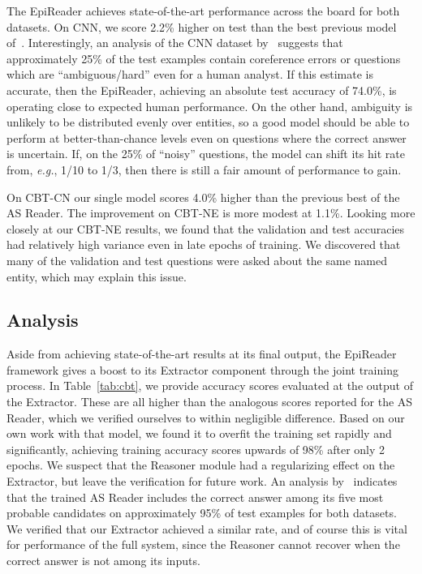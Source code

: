 \documentclass[11pt,letterpaper]{article}
\begin{document}
The EpiReader achieves state-of-the-art performance across the board for both datasets. On CNN, we score 2.2\% higher on test than the best previous model of~. Interestingly, an analysis of the CNN dataset by~ suggests that approximately 25\% of the test examples contain coreference errors or questions which are ``ambiguous/hard'' even for a human analyst. If this estimate is accurate, then the EpiReader, achieving an absolute test accuracy of 74.0\%, is operating close to expected human performance. On the other hand, ambiguity is unlikely to be distributed evenly over entities, so a good model should be able to perform at better-than-chance levels even on questions where the correct answer is uncertain. If, on the 25\% of ``noisy'' questions, the model can shift its hit rate from, {\it e.g.}, 1/10 to 1/3, then there is still a fair amount of performance to gain.

On CBT-CN our single model scores 4.0\% higher than the previous best of the AS Reader. The improvement on CBT-NE is more modest at 1.1\%. Looking more closely at our CBT-NE results, we found that the validation and test accuracies had relatively high variance even in late epochs of training. We discovered that many of the validation and test questions were asked about the same named entity, which may explain this issue.

\subsection{Analysis}
Aside from achieving state-of-the-art results at its final output, the EpiReader framework gives a boost to its Extractor component through the joint training process. In Table~\ref{tab:cbt}, we provide accuracy scores evaluated at the output of the Extractor. These are all higher than the analogous scores reported for the AS Reader, which we verified ourselves to within negligible difference. Based on our own work with that model, we found it to overfit the training set rapidly and significantly, achieving training accuracy scores upwards of 98\% after only 2 epochs. We suspect that the Reasoner module had a regularizing effect on the Extractor, but leave the verification for future work. An analysis by~ indicates that the trained AS Reader includes the correct answer among its five most probable candidates on approximately 95\% of test examples for both datasets. We verified that our Extractor achieved a similar rate, and of course this is vital for performance of the full system, since the Reasoner cannot recover when the correct answer is not among its inputs. 
\end{document}
